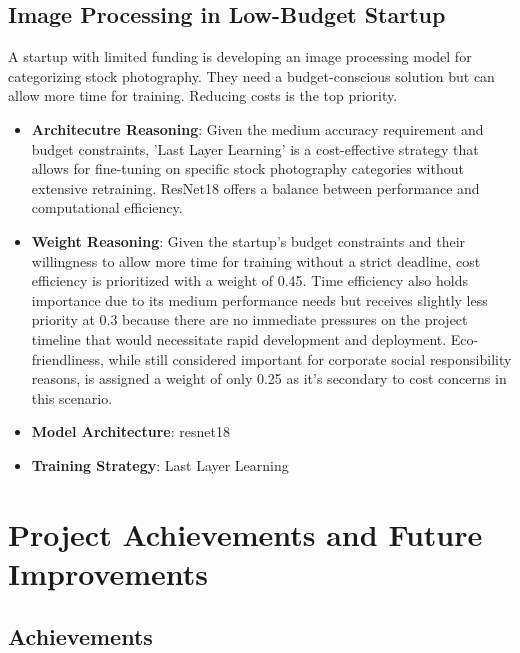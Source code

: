 \documentclass{report}
\begin{document}
\section{Image Processing in Low-Budget Startup}

A startup with limited funding is developing an image processing model for categorizing stock photography. They need a budget-conscious solution but can allow more time for training. Reducing costs is the top priority.

\begin{itemize}
    \item \textbf{Architecutre Reasoning}: Given the medium accuracy requirement and budget constraints, 'Last Layer Learning' is a cost-effective strategy that allows for fine-tuning on specific stock photography categories without extensive retraining. ResNet18 offers a balance between performance and computational efficiency. 
    
    \item \textbf{Weight Reasoning}: Given the startup's budget constraints and their willingness to allow more time for training without a strict deadline, cost efficiency is prioritized with a weight of 0.45. Time efficiency also holds importance due to its medium performance needs but receives slightly less priority at 0.3 because there are no immediate pressures on the project timeline that would necessitate rapid development and deployment. Eco-friendliness, while still considered important for corporate social responsibility reasons, is assigned a weight of only 0.25 as it's secondary to cost concerns in this scenario. 
    
    \item \textbf{Model Architecture}: resnet18 
    
    \item \textbf{Training Strategy}:  Last Layer Learning 
\end{itemize}

\chapter{Project Achievements and Future Improvements}

\section{Achievements}
\end{document}
